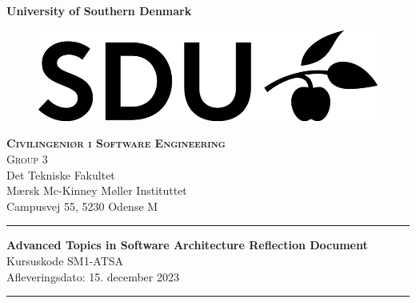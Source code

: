 \begin{titlepage}
    \begin{center}
        
        {\Huge \textbf{University of Southern Denmark}}

        \normalsize
        \vspace{0.5 cm}

        \begin{figure}
            \centering
                \includegraphics{Images/sduLogo.png} 
            \label{fig:front:logo}
        \end{figure}
        
        \textsc{\Large \textbf{Civilingeniør i Software Engineering}}\\[0.5cm]
        \textsc{\large  Group 3} \\ Det Tekniske Fakultet \\ Mærsk Mc-Kinney Møller Instituttet \\ Campusvej 55, 5230 Odense M\\[0.5cm] 
        
        \vspace{0.5cm}
        \begin{centering}
        \hrule
        \vspace{.2cm}
         \LARGE \textbf{Advanced Topics in Software Architecture Reflection Document}\\
         \large Kursuskode SM1-ATSA\\
         \large  Afleveringsdato: 15. december 2023
        \vspace{.2cm}
        \hrule
        \end{centering}
        \vspace{1cm}
        

\end{center}
\end{titlepage}
